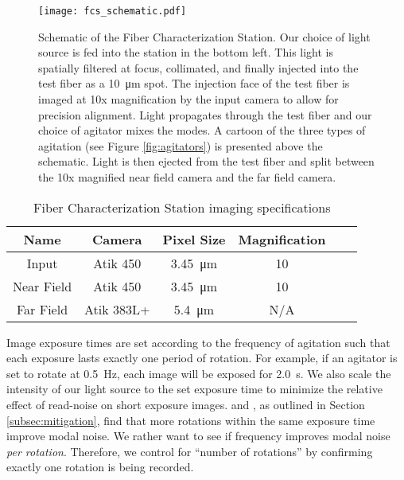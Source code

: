 \documentclass[twocolumn]{emulateapj}
\begin{document}
\begin{figure}
\centering
	\texttt{[image: fcs\_schematic.pdf]}
	\caption{Schematic of the Fiber Characterization Station. Our choice of light source is fed into the station in the bottom left. This light is spatially filtered at focus, collimated, and finally injected into the test fiber as a \SI{10}{\micro\meter} spot. The injection face of the test fiber is imaged at 10x magnification by the input camera to allow for precision alignment. Light propagates through the test fiber and our choice of agitator mixes the modes. A cartoon of the three types of agitation (see Figure \ref{fig:agitators}) is presented above the schematic. Light is then ejected from the test fiber and split between the 10x magnified near field camera and the far field camera.}
\label{fig:fcs}
\end{figure}

\begin{table}
\centering
\caption{Fiber Characterization Station imaging specifications}
	\begin{tabular}{cccccc}
	\hline
	Name & Camera & Pixel Size & Magnification \\
	\hline \hline
	Input & Atik 450 & \SI{3.45}{\micro\meter} & 10 \\
	\hline
	Near Field & Atik 450 & \SI{3.45}{\micro\meter} & 10 \\
	\hline
	Far Field & Atik 383L+ & \SI{5.4}{\micro\meter} & N/A \\
	\hline	
	\end{tabular}
\label{table:cameras}
\end{table}

Image exposure times are set according to the frequency of agitation such that each exposure lasts exactly one period of rotation. For example, if an agitator is set to rotate at \SI{0.5}{\hertz}, each image will be exposed for \SI{2.0}{\second}. We also scale the intensity of our light source to the set exposure time to minimize the relative effect of read-noise on short exposure images. \citet{Baudrand2001} and \citet{Lemke2011}, as outlined in Section \ref{subsec:mitigation}, find that more rotations within the same exposure time improve modal noise. We rather want to see if frequency improves modal noise \textit{per rotation}. Therefore, we control for ``number of rotations'' by confirming exactly one rotation is being recorded.
\end{document}
